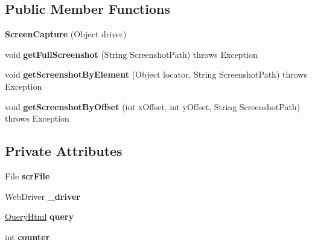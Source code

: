 \subsection*{Public Member Functions}
\begin{DoxyCompactItemize}
\item 
\hypertarget{classcom_1_1zeuslearning_1_1automation_1_1io_1_1ScreenCapture_abb2d0520aca4390d76d3f47f507c72b8}{}\label{classcom_1_1zeuslearning_1_1automation_1_1io_1_1ScreenCapture_abb2d0520aca4390d76d3f47f507c72b8} 
{\bfseries Screen\+Capture} (Object driver)
\item 
\hypertarget{classcom_1_1zeuslearning_1_1automation_1_1io_1_1ScreenCapture_a15f6f8badae25f3c2c0f33a6ca6dc401}{}\label{classcom_1_1zeuslearning_1_1automation_1_1io_1_1ScreenCapture_a15f6f8badae25f3c2c0f33a6ca6dc401} 
void {\bfseries get\+Full\+Screenshot} (String Screenshot\+Path)  throws Exception 
\item 
\hypertarget{classcom_1_1zeuslearning_1_1automation_1_1io_1_1ScreenCapture_a6097e1d32ec8910fa6ce7a0c88c65741}{}\label{classcom_1_1zeuslearning_1_1automation_1_1io_1_1ScreenCapture_a6097e1d32ec8910fa6ce7a0c88c65741} 
void {\bfseries get\+Screenshot\+By\+Element} (Object locator, String Screenshot\+Path)  throws Exception 
\item 
\hypertarget{classcom_1_1zeuslearning_1_1automation_1_1io_1_1ScreenCapture_ac746c17d691b326e2c3f6c0026b27ad1}{}\label{classcom_1_1zeuslearning_1_1automation_1_1io_1_1ScreenCapture_ac746c17d691b326e2c3f6c0026b27ad1} 
void {\bfseries get\+Screenshot\+By\+Offset} (int x\+Offset, int y\+Offset, String Screenshot\+Path)  throws Exception 
\end{DoxyCompactItemize}
\subsection*{Private Attributes}
\begin{DoxyCompactItemize}
\item 
\hypertarget{classcom_1_1zeuslearning_1_1automation_1_1io_1_1ScreenCapture_acda068152091adcc1bc0280ea386d7c7}{}\label{classcom_1_1zeuslearning_1_1automation_1_1io_1_1ScreenCapture_acda068152091adcc1bc0280ea386d7c7} 
File {\bfseries scr\+File}
\item 
\hypertarget{classcom_1_1zeuslearning_1_1automation_1_1io_1_1ScreenCapture_ae0543391745e6c0461aaa23030e86573}{}\label{classcom_1_1zeuslearning_1_1automation_1_1io_1_1ScreenCapture_ae0543391745e6c0461aaa23030e86573} 
Web\+Driver {\bfseries \+\_\+driver}
\item 
\hypertarget{classcom_1_1zeuslearning_1_1automation_1_1io_1_1ScreenCapture_ad7e1377510930feb5459cc048a7d31cf}{}\label{classcom_1_1zeuslearning_1_1automation_1_1io_1_1ScreenCapture_ad7e1377510930feb5459cc048a7d31cf} 
\hyperlink{classcom_1_1zeuslearning_1_1automation_1_1selenium_1_1interactions_1_1QueryHtml}{Query\+Html} {\bfseries query}
\item 
\hypertarget{classcom_1_1zeuslearning_1_1automation_1_1io_1_1ScreenCapture_aefef351ef4dd59af3d490d4ee9b58cc5}{}\label{classcom_1_1zeuslearning_1_1automation_1_1io_1_1ScreenCapture_aefef351ef4dd59af3d490d4ee9b58cc5} 
int {\bfseries counter}
\end{DoxyCompactItemize}
